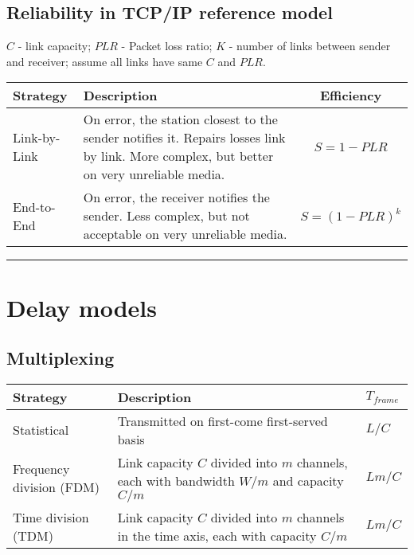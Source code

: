 \documentclass{form}
\begin{document}
\subsection*{Reliability in TCP/IP reference model}
$C$ - link capacity; $PLR$ - Packet loss ratio; $K$ - number of links between sender and receiver; assume all links have same $C$ and $PLR$.
\begin{center}
    \begin{tabular}{l | p{120mm} | c}
        \textbf{Strategy} & \textbf{Description} & \textbf{Efficiency}\\ \hline
        Link-by-Link      & On error, the station closest to the sender notifies it. Repairs losses link by link. More complex, but better on very unreliable media. & $S=1-PLR$ \\
        End-to-End        & On error, the receiver notifies the sender. Less complex, but not acceptable on very unreliable media. & $S=(1-PLR)^k$
    \end{tabular}
\end{center}

\vspace{-0.5em}\noindent\rule{\textwidth}{0.4pt}\vspace{-1em}

\section*{Delay models}
\subsection*{Multiplexing}
\begin{center}
    \begin{tabular}{l | p{135mm} | l}
        \textbf{Strategy}        & \textbf{Description}                                                                      & $T_{frame}$ \\ \hline
        Statistical              & Transmitted on first-come first-served basis                                              & $L/C$       \\
        Frequency division (FDM) & Link capacity $C$ divided into $m$ channels, each with bandwidth $W/m$ and capacity $C/m$ & $Lm/C$      \\
        Time division (TDM)      & Link capacity $C$ divided into $m$ channels in the time axis, each with capacity $C/m$    & $Lm/C$      \\
    \end{tabular}
\end{center}
\end{document}

